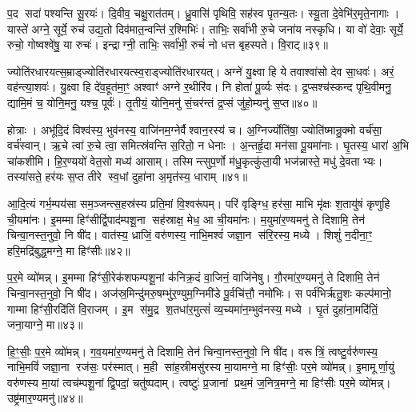 प॒द सदा॑ पश्यन्ति सू॒रयः॑। दि॒वीव॒ चक्षु॒रात॑तम्। ध्रु॒वासि॑ पृथिवि॒ सह॑स्व पृतन्य॒तः। स्यू॒ता दे॒वेभि॑र॒मृते॒नागाः। यास्ते॑ अग्ने॒ सूर्ये॒ रुच॑ उद्य॒तो दिव॑मात॒न्वन्ति॑ र॒श्मिभिः॑। ताभिः॒ सर्वा॑भी रु॒चे जना॑य नस्कृधि। या वो॑ देवाः॒ सूर्ये॒ रुचो॒ गोष्वश्वे॑षु॒ या रुचः॑। इन्द्राग्नी॒ ताभिः॒ सर्वा॑भी॒ रुचं॑ नो धत्त बृहस्पते। वि॒राट्॥३९॥

ज्योति॑रधारयत्स॒म्राड्ज्योति॑रधारयत्स्व॒राड्ज्योति॑रधारयत्। अग्ने॑ यु॒क्ष्वा हि ये तवाश्वा॑सो देव सा॒धवः॑। अरं॒ वह॑न्त्या॒शवः॑। यु॒क्ष्वा हि दे॑व॒हूत॑मा॒ꣳ॒ अश्वाꣳ॑ अग्ने र॒थीरि॑व। नि होता॑ पू॒र्व्यः स॑दः। द्र॒प्सश्च॑स्कन्द पृथि॒वीमनु॒ द्यामि॒मं च॒ योनि॒मनु॒ यश्च॒ पूर्वः॑। तृ॒तीयं॒ योनि॒मनु॑ सं॒चर॑न्तं द्र॒प्सं जु॑हो॒म्यनु॑ स॒प्त॥४०॥

होत्राः। अभू॑दि॒दं विश्व॑स्य॒ भुव॑नस्य॒ वाजि॑नम॒ग्नेर्वैश्वान॒रस्य॑ च। अ॒ग्निर्ज्योति॑षा॒ ज्योति॑ष्मान्रु॒क्मो वर्च॑सा॒ वर्च॑स्वान्। ऋ॒चे त्वा॑ रु॒चे त्वा॒ समित्स्र॑वन्ति स॒रितो॒ न धेनाः। अ॒न्तर्\mbox{}हृ॒दा मन॑सा पू॒यमा॑नाः। घृ॒तस्य॒ धारा॑ अ॒भि चा॑कशीमि। हि॒र॒ण्ययो॑ वेत॒सो मध्य॑ आसाम्। तस्मिन्त्सुप॒र्णो म॑धु॒कृत्कु॑ला॒यी भज॑न्नास्ते॒ मधु॑ दे॒वताभ्यः। तस्या॑सते॒ हर॑यः स॒प्त तीरे स्व॒धां दुहा॑ना अ॒मृत॑स्य॒ धाराम्॥४१॥

{\anuvakamend[{प्र॒ति॒ष्ठायै॑ स॒हस्र॑वीर्या पर॒मं वि॒राट्थ्स॒प्त तीरे॑ च॒त्वारि॑ च॥९॥}]}

आ॒दि॒त्यं गर्भ॒म्पय॑सा सम॒ञ्जन्त्स॒हस्र॑स्य प्रति॒मां वि॒श्वरू॑पम्। परि॑ वृङ्ग्धि॒ हर॑सा॒ माभि मृ॑क्षः श॒तायु॑षं कृणुहि ची॒यमा॑नः। इ॒मम्मा हिꣳ॑सीर्द्वि॒पाद॑म्पशू॒ना सह॑स्राक्ष॒ मेध॒ आ ची॒यमा॑नः। म॒युमा॑र॒ण्यमनु॑ ते दिशामि॒ तेन॑ चिन्वा॒नस्त॒नुवो॒ नि षी॑द। वात॑स्य॒ ध्राजिं॒ वरु॑णस्य॒ नाभि॒मश्वं॑ जज्ञा॒न स॑रि॒रस्य॒ मध्ये। शिशुं॑ न॒दीना॒ꣳ॒ हरि॒मद्रि॑बुद्ध॒मग्ने॒ मा हिꣳ॑सीः॥४२॥

प॒र॒मे व्यो॑मन्न्। इ॒मम्मा हिꣳ॑सी॒रेक॑शफम्पशू॒नां क॑निक्र॒दं वा॒जिनं॒ वाजि॑नेषु। गौ॒रमा॑र॒ण्यमनु॑ ते दिशामि॒ तेन॑ चिन्वा॒नस्त॒नुवो॒ नि षी॑द। अज॑स्र॒मिन्दु॑मरु॒षम्भु॑र॒ण्युम॒ग्निमी॑डे पू॒र्वचि॑त्तौ॒ नमो॑भिः। स पर्व॑भिर्\mbox{}ऋतु॒शः कल्प॑मानो॒ गाम्मा हिꣳ॑सी॒रदि॑तिं वि॒राजम्। इ॒म स॑मु॒द्र श॒तधा॑र॒मुत्सं॑ व्य॒च्यमा॑न॒म्भुव॑नस्य॒ मध्ये। घृ॒तं दुहा॑ना॒मदि॑तिं॒ जना॒याग्ने॒ मा॥४३॥

हि॒ꣳ॒सीः॒ प॒र॒मे व्यो॑मन्न्। ग॒व॒यमा॑र॒ण्यमनु॑ ते दिशामि॒ तेन॑ चिन्वा॒नस्त॒नुवो॒ नि षी॑द। वरूत्रिं॒ त्वष्टु॒र्वरु॑णस्य॒ नाभि॒मविं॑ जज्ञा॒ना रज॑सः॒ पर॑स्मात्। म॒ही सा॑ह॒स्रीमसु॑रस्य मा॒यामग्ने॒ मा हिꣳ॑सीः॒ पर॒मे व्यो॑मन्न्। इ॒मामूर्णा॒युं वरु॑णस्य मा॒यां त्वच॑म्पशू॒नां द्वि॒पदां॒ चतु॑ष्पदाम्। त्वष्टुः॑ प्र॒जानां प्रथ॒मं ज॒नित्र॒मग्ने॒ मा हिꣳ॑सीः पर॒मे व्यो॑मन्न्। उष्ट्र॑मार॒ण्यमनु॑॥४४॥


